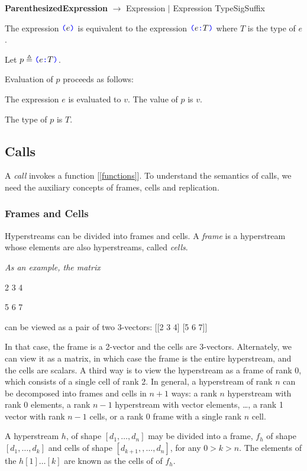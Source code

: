 \documentclass{article}
\begin{document}
{\bf ParenthesizedExpression} $\rightarrow$ \LPAREN{} Expression \RPAREN{} $|$ \LPAREN{} Expression TypeSigSuffix \RPAREN{}


The expression  $\texttt{\color{blue} (}{}e \texttt{\color{blue} )}{}$ is equivalent to the expression $\texttt{\color{blue} (}{}e \texttt{\color{blue} :}{} T \texttt{\color{blue} )}{}$ where $T$ is the type of $e$.

Let $p \triangleq \texttt{\color{blue} (}{}e \texttt{\color{blue} :}{} T \texttt{\color{blue} )}{}$.

Evaluation of $p$ proceeds as follows:

The expression $e$ is evaluated to $v$. The value of $p$ is $v$.

The type of $p$ is $T$.

\subsection{Calls}
\label{calls}

A {\em call} invokes a function [\ref{functions}]. To understand the semantics of calls, we need the auxiliary concepts of frames, cells and replication.


\subsubsection{Frames and Cells}
\label{framesAndCells}

Hyperstreams can be divided into frames and cells. A {\em frame} is a hyperstream whose elements are also hyperstreams, called {\em cells}.

{\em As an example, the matrix 

2 3 4

5 6 7

 can be viewed as a pair of two 3-vectors:
[[2 3 4] [5 6 7]]

In that case, the frame is a 2-vector and the cells are 3-vectors.  Alternately, we can view it as a matrix, in which case the frame is the entire hyperstream, and the cells are scalars. A third way is to view the hyperstream as a frame of rank 0, which consists of a single cell of rank 2. In general, a hyperstream of rank $n$ can be decomposed into frames and cells in $n+1$ ways: a rank $n$ hyperstream with rank 0 elements, a rank $n-1$ hyperstream with vector elements, …, a rank 1 vector with rank $n-1$ cells, or a rank 0 frame with a single rank $n$ cell.
}

A hyperstream $h$, of shape $[d_1, \ldots, d_n]$ may be divided into a frame, $f_h$ of shape $[d_1, \ldots, d_k]$ and cells of shape $[d_{k+1}, , \ldots, d_n]$, for any $0 > k > n$.
The elements of the $h[1] \ldots [k]$ are known as the cells of of $f_h$.
\end{document}
